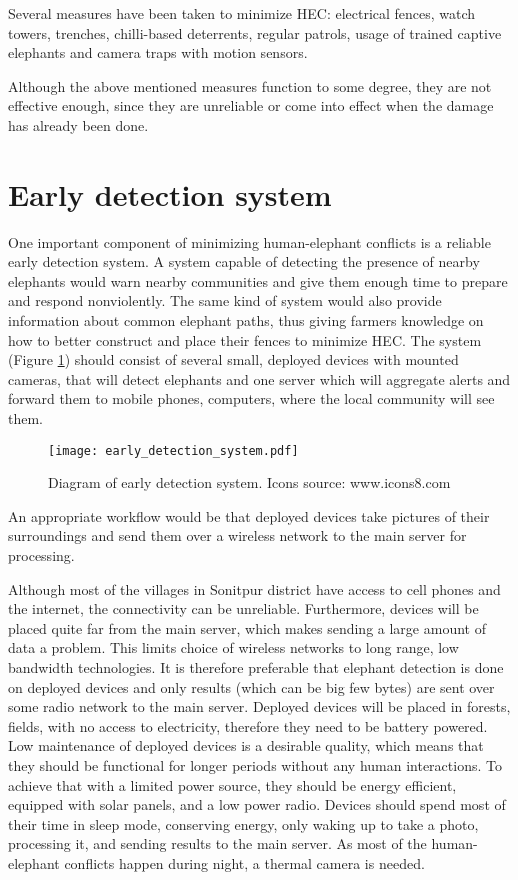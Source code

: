 Several measures have been taken to minimize HEC: electrical fences, watch towers, trenches, chilli-based deterrents, regular patrols, usage of trained captive elephants and camera traps with motion sensors.

Although the above mentioned measures function to some degree, they are not effective enough, since they are unreliable or come into effect when the damage has already been done\cite{wildlabs}. 

\section{ Early detection system}

One important component of minimizing human-elephant conflicts is a reliable early detection system. 
A system capable of detecting the presence of nearby elephants would warn nearby communities and give them enough time to prepare and respond nonviolently.
The same kind of system would also provide information about common elephant paths, thus giving farmers knowledge on how to better construct and place their fences to minimize HEC.
The system (Figure \ref{early_detection_system}) should consist of several small, deployed devices with mounted cameras, that will detect elephants and one server which will aggregate alerts and forward them to mobile phones, computers, where the local community will see them.

\begin{figure}[h]
        \centering
        \texttt{[image: early\_detection\_system.pdf]} 
        \caption{Diagram of early detection system. Icons source: www.icons8.com}
        \label{early_detection_system}
\end{figure}

An appropriate workflow would be that deployed devices take pictures of their surroundings and send them over a wireless network to the main server for processing.

Although most of the villages in Sonitpur district have access to cell phones and the internet, the connectivity can be unreliable\cite{wildlabs-elephants}. 
Furthermore, devices will be placed quite far from the main server, which makes sending a large amount of data a problem. 
This limits choice of wireless networks to long range, low bandwidth technologies.
It is therefore preferable that elephant detection is done on deployed devices and only results (which can be big few bytes) are sent over some radio network to the main server.
Deployed devices will be placed in forests, fields, with no access to electricity, therefore they need to be battery powered.
Low maintenance of deployed devices is a desirable quality, which means that they should be functional for longer periods without any human interactions.
To achieve that with a limited power source, they should be energy efficient, equipped with solar panels, and a low power radio.
Devices should spend most of their time in sleep mode, conserving energy, only waking up to take a photo, processing it, and sending results to the main server.
As most of the human-elephant conflicts happen during night\cite{wildlabs-elephants}, a thermal camera is needed.


